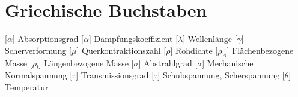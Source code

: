 \section*{Griechische Buchstaben}
% 
%
\begin{acronym}[-------------------] 	%
		[$\alpha$]		{\acrounit{-}
		Absorptionsgrad
	} %
		[$\alpha$]		{\acrounit{\neper\per\m}
		Dämpfungskoeffizient
	} %
		[$\lambda$]		{\acrounit{\m}
		Wellenlänge
	} %
	    [$\gamma$]  	{\acrounit{-}
		Scherverformung
	} %
			[$\mu$]			{\acrounit{-}
		Querkontraktionszahl
	} %
			[$\rho$]		{\acrounit{\kg\per\m\cubed}
		Rohdichte
	} %
			[$\rho_A$]		{\acrounit{\kg\per\m\squared}
		Flächenbezogene Masse
	} %
			[$\rho_l$]		{\acrounit{\kg\per\m}
		Längenbezogene Masse
	} %
	    [$\sigma$]  	{\acrounit{-}
		Abstrahlgrad
	}
	    [$\sigma$]  	{\acrounit{\newton\per\meter\squared}
		Mechanische Normalspannung
	} %
			[$\tau$]		{\acrounit{-}
		Transmissionsgrad
	} %
			[$\tau$]		{\acrounit{\newton\per\m\squared}
		Schubspannung, Scherspannung
	} %
		[$\theta$]		{\acrounit{\kelvin}
		Temperatur
	} %

\end{acronym}
